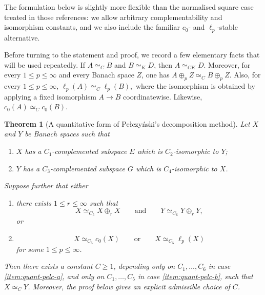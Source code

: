 \documentclass[11pt]{amsart}
\theoremstyle{plain}
\newtheorem{theorem}{Theorem}[section]
\theoremstyle{definition}
\numberwithin{equation}{section}
\renewcommand{\le}{\leqslant}
\renewcommand{\ge}{\geqslant}
\renewcommand{\leq}{\leqslant}
\begin{document}
The formulation below is slightly more flexible than the normalised square case treated in those references: we allow arbitrary complementability and isomorphism constants, and we also include the familiar $c_0$- and $\ell_p$-stable alternative.

Before turning to the statement and proof, we record a few elementary facts that will be used repeatedly.
If $A \simeq_C B$ and $B \simeq_K D$, then $A \simeq_{CK} D$.
Moreover, for every $1 \leq p \leq \infty$ and every Banach space $Z$, one has
\(
    A \oplus_p Z \simeq_C B \oplus_p Z.
\)
Also, for every $1 \leq p \leq \infty$,
\(
    \ell_p(A) \simeq_C \ell_p(B),
\)
where the isomorphism is obtained by applying a fixed isomorphism $A \to B$ coordinatewise.
Likewise,
\(
    c_0(A) \simeq_C c_0(B).
\)

\begin{theorem}[A quantitative form of Pe{\l}czy\'nski's decomposition method]\label{thm:quant-pelc}
Let $X$ and $Y$ be Banach spaces such that
\begin{enumerate}[label=\textup{(\roman*)}]
    \item $X$ has a $C_1$-complemented subspace $E$ which is $C_2$-isomorphic to $Y$;
    \item $Y$ has a $C_3$-complemented subspace $G$ which is $C_4$-isomorphic to $X$.
\end{enumerate}
Suppose further that either
\begin{enumerate}[label=(\alph*), ref=(\alph*)]
    \item \label{item:quant-pelc-a}
    there exists $1 \le r \le \infty$ such that
    \[
        X \simeq_{C_5} X \oplus_r X
        \qquad\text{and}\qquad
        Y \simeq_{C_6} Y \oplus_r Y,
    \]
    or
    \item \label{item:quant-pelc-b}
    \[
        X \simeq_{C_5} c_0(X)
        \qquad\text{or}\qquad
        X \simeq_{C_5} \ell_p(X)
    \]
    for some $1 \le p \le \infty$.
\end{enumerate}
Then there exists a constant $C \ge 1$, depending only on $C_1,\dots,C_6$ in case \ref{item:quant-pelc-a}, and only on $C_1,\dots,C_5$ in case \ref{item:quant-pelc-b}, such that $X \simeq_C Y$.
Moreover, the proof below gives an explicit admissible choice of $C$.
\end{theorem}
\end{document}
